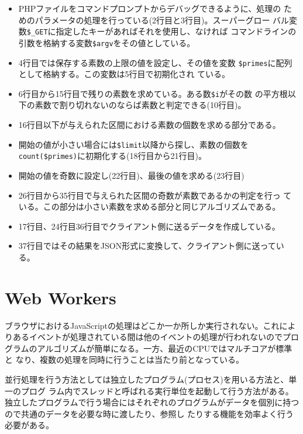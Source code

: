 \begin{Exec}
 \begin{itemize}
  \item PHPファイルをコマンドプロンプトからデバッグできるように、処理の
        ためのパラメータの処理を行っている(2行目と3行目)。スーパーグロー
        バル変数\Verb+$_GET+に指定したキーがあればそれを使用し、なければ
        コマンドラインの引数を格納する変数\Verb+$argv+をその値としている。
  \item 4行目では保存する素数の上限の値を設定し、その値を変数
        \Verb+$primes+に配列として格納する。この変数は5行目で初期化され
        ている。
  \item 6行目から15行目で残りの素数を求めている。ある数\Verb+$i+がその数
        の平方根以下の素数で割り切れないのならば素数と判定できる(10行目)。
  \item 16行目以下が与えられた区間における素数の個数を求める部分である。
  \item 開始の値が小さい場合には\Verb+$limit+以降から探し、素数の個数を
        \Verb+count($primes)+に初期化する(18行目から21行目)。
  \item 開始の値を奇数に設定し(22行目)、最後の値を求める(23行目)
  \item 26行目から35行目で与えられた区間の奇数が素数であるかの判定を行っ
        ている。この部分は小さい素数を求める部分と同じアルゴリズムである。
  \item 17行目、24行目36行目でクライアント側に送るデータを作成している。
  \item 37行目ではその結果をJSON形式に変換して、クライアント側に送ってい
        る。
 \end{itemize}
\end{Exec}
\fi
\section{Web Workers}
\iffalse
ブラウザにおけるJavaScriptの処理はどこか一か所しか実行されない。これによ
りあるイベントが処理されている間は他のイベントの処理が行われないのでプロ
グラムのアルゴリズムが簡単になる。一方、最近のCPUではマルチコアが標準と
なり、複数の処理を同時に行うことは当たり前となっている。

並行処理を行う方法としては独立したプログラム(プロセス)を用いる方法と、単一のプログ
ラム内でスレッドと呼ばれる実行単位を起動して行う方法がある。
独立したプログラムで行う場合にはそれぞれのプログラムがデータを個別に持つ
ので共通のデータを必要な時に渡したり、参照し
たりする機能を効率よく行う必要がある。

